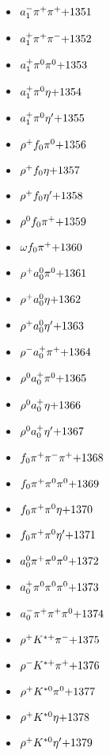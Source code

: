 \begin{multicols}{3}
\begin{itemize}
 \item $ a_{1}^{-} \pi^{+} \pi^{+} \hfill{+1351}$
 \item $ a_{1}^{+} \pi^{+} \pi^{-} \hfill{+1352}$
 \item $ a_{1}^{+} \pi^{0} \pi^{0} \hfill{+1353}$
 \item $ a_{1}^{+} \pi^{0} \eta \hfill{+1354}$
 \item $ a_{1}^{+} \pi^{0} {\eta^{\prime}} \hfill{+1355}$
 \item $ \rho^{+} f_{0} \pi^{0} \hfill{+1356}$
 \item $ \rho^{+} f_{0} \eta \hfill{+1357}$
 \item $ \rho^{+} f_{0} {\eta^{\prime}} \hfill{+1358}$
 \item $ \rho^{0} f_{0} \pi^{+} \hfill{+1359}$
 \item $ \omega f_{0} \pi^{+} \hfill{+1360}$
 \item $ \rho^{+} a_{0}^{0} \pi^{0} \hfill{+1361}$
 \item $ \rho^{+} a_{0}^{0} \eta \hfill{+1362}$
 \item $ \rho^{+} a_{0}^{0} {\eta^{\prime}} \hfill{+1363}$
 \item $ \rho^{-} a_{0}^{+} \pi^{+} \hfill{+1364}$
 \item $ \rho^{0} a_{0}^{+} \pi^{0} \hfill{+1365}$
 \item $ \rho^{0} a_{0}^{+} \eta \hfill{+1366}$
 \item $ \rho^{0} a_{0}^{+} {\eta^{\prime}} \hfill{+1367}$
 \item $ f_{0} \pi^{+} \pi^{-} \pi^{+} \hfill{+1368}$
 \item $ f_{0} \pi^{+} \pi^{0} \pi^{0} \hfill{+1369}$
 \item $ f_{0} \pi^{+} \pi^{0} \eta \hfill{+1370}$
 \item $ f_{0} \pi^{+} \pi^{0} {\eta^{\prime}} \hfill{+1371}$
 \item $ a_{0}^{0} \pi^{+} \pi^{0} \pi^{0} \hfill{+1372}$
 \item $ a_{0}^{+} \pi^{0} \pi^{0} \pi^{0} \hfill{+1373}$
 \item $ a_{0}^{-} \pi^{+} \pi^{+} \pi^{0} \hfill{+1374}$
 \item $ \rho^{+} K^{*+} \pi^{-} \hfill{+1375}$
 \item $ \rho^{-} K^{*+} \pi^{+} \hfill{+1376}$
 \item $ \rho^{+} K^{*0} \pi^{0} \hfill{+1377}$
 \item $ \rho^{+} K^{*0} \eta \hfill{+1378}$
 \item $ \rho^{+} K^{*0} {\eta^{\prime}} \hfill{+1379}$

\end{itemize}
\end{multicols}
